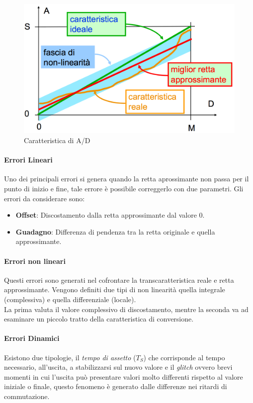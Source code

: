 \documentclass[12pt]{article}
\begin{document}
\begin{figure}[!hpt]
  \includegraphics[width=\textwidth]{images/caratt.png}
  \caption{Caratteristica di A/D}
  \label{fig:caratt}
\end{figure}

\paragraph{Errori Lineari}
Uno dei principali errori si genera quando la retta aprossimante non passa per il punto di inizio e fine, tale errore è possibile correggerlo con due parametri. Gli errori da considerare sono:
\begin{itemize}
  \item \textbf{Offset}: Discostamento dalla retta approssimante dal valore 0.
  \item \textbf{Guadagno}: Differenza di pendenza tra la retta originale e quella approssimante.
\end{itemize}

\paragraph{Errori non lineari} Questi errori sono generati nel cofrontare la transcaratteristica reale e retta approssimante. Vengono definiti due tipi di non linearità quella integrale (complessiva) e quella differenziale (locale).\\
La prima valuta il valore complessivo di discostamento, mentre la seconda va ad esaminare un piccolo tratto della caratteristica di conversione.

\paragraph{Errori Dinamici} Esistono due tipologie, il \textit{tempo di assetto} ($T_{S}$) che corrisponde al tempo necessario, all'uscita, a stabilizzarsi sul nuovo valore e il \textit{glitch} ovvero brevi momenti in cui l'uscita può presentare valori molto differenti rispetto al valore iniziale o finale, questo fenomeno è generato dalle differenze nei ritardi di commutazione.
\end{document}
